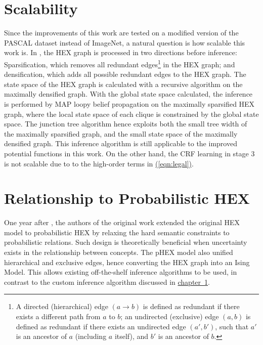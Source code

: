 \documentclass[11pt,a4paper]{book}
\begin{document}
\section{Scalability}
\label{sec:scale}

Since the improvements of this work are tested on a modified version of the PASCAL dataset instead of ImageNet, a natural question is how scalable this work is. In \cite{deng2014large}, the HEX graph is processed in two directions before inference: Sparsification, which removes all redundant edges\footnote{A directed (hierarchical) edge $(a\rightarrow b)$ is defined as redundant if there exists a different path from $a$ to $b$; an undirected (exclusive) edge $(a,b)$ is defined as redundant if there exists an undirected edge $(a',b')$, such that $a'$ is an ancestor of $a$ (including $a$ itself), and $b'$ is an ancestor of $b$.} in the HEX graph; and densification, which adds all possible redundant edges to the HEX graph. The state space of the HEX graph is calculated with a recursive algorithm on the maximally densified graph. With the global state space calculated, the inference is performed by MAP loopy belief propagation on the maximally sparsified HEX graph, where the local state space of each clique is constrained by the global state space. The junction tree algorithm hence exploits both the small tree width of the maximally sparsified graph, and the small state space of the maximally densified graph. This inference algorithm is still applicable to the improved potential functions in this work. On the other hand, the CRF learning in stage 3 is not scalable due to to the high-order terms in \hyperref[eqn:legal]{(\ref{eqn:legal})}.

\section{Relationship to Probabilistic HEX}

One year after \cite{deng2014large}, the authors of the original work extended the original HEX model to probabilistic HEX \cite{ding2015probabilistic} by relaxing the hard semantic constraints to probabilistic relations. Such design is theoretically beneficial when uncertainty exists in the relationship between concepts. The pHEX model also unified hierarchical and exclusive edges, hence converting the HEX graph into an Ising Model. This allows existing off-the-shelf inference algorithms to be used, in contrast to the custom inference algorithm discussed in \hyperref[sec:scale]{chapter~\ref{sec:scale}}.
\end{document}
